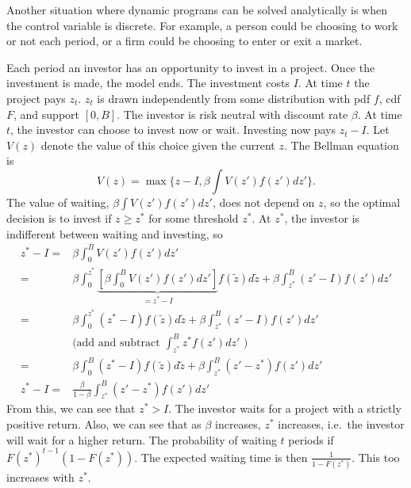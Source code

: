 Another situation where dynamic programs can be solved analytically is
when the control variable is discrete. For example, a person could be
choosing to work or not each period, or a firm could be choosing to
enter or exit a market. 

\begin{example}
  Each period an investor has an opportunity to invest in a
  project. Once the investment is made, the model ends. The investment
  costs $I$. At time $t$ the project pays $z_t$. $z_t$ is drawn
  independently from some distribution with pdf $f$, cdf $F$, and
  support $[0, B]$.
  The investor is risk neutral with discount rate $\beta$. At
  time $t$, the investor can choose to invest now or wait. Investing
  now pays $z_t - I$. Let $V(z)$ denote the value of this choice given the
  current $z$. The Bellman equation is 
  \[ V(z) = \max\{ z- I , \beta \int V(z') f(z') dz' \}. \]
  The value of waiting, $\beta \int V(z') f(z') dz'$, does not depend
  on $z$, so the optimal decision is to invest if $z \geq z^*$ for
  some threshold $z^*$. At $z^*$, the investor is indifferent between
  waiting and investing, so
  \begin{align*}
    z^* - I = & \beta \int_0^B V(z') f(z') dz' \\
    = & \beta \int_0^{z^*} \underbrace{\left[\beta \int_0^B V(z')
        f(z') dz'\right]}_{=z^* - I}
    f(\tilde{z}) d\tilde{z} + \beta \int_{z^*}^B (z' - I) f(z') dz' \\
    = & \beta \int_0^{z^*} (z^* - I) f(\tilde{z}) d\tilde{z} + \beta
    \int_{z^*}^B (z' - I) f(z') dz' \\
    & \text{(add and subtract $\int_{z^*}^B z^* f(z')dz'$ )} \\
    = & \beta \int_0^{B} (z^* - I) f(\tilde{z}) d\tilde{z} + \beta
    \int_{z^*}^B (z' - z^*) f(z') dz' \\
    z^* - I = & \frac{\beta}{1-\beta} \int_{z^*}^B (z' - z^*) f(z') dz'
  \end{align*}
  From this, we can see that $z^* > I$. The investor waits for a
  project with a strictly positive return. Also, we can see that as
  $\beta$ increases, $z^*$ increases, i.e.\ the investor will wait for
  a higher return. The probability of waiting $t$ periods if
  $F(z^*)^{t-1} (1-F(z^*))$. The expected waiting time is then
  $\frac{1}{1-F(z^*)}$. This too increases with $z^*$. 


\end{example}
